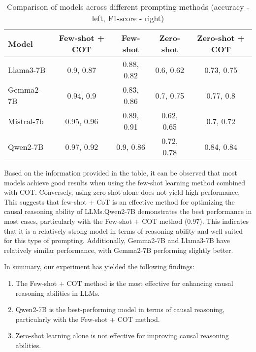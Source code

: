 \begin{table}[ht]
  \centering
  \begin{tabular}{|l|c|c|c|c|}
      \hline
      \textbf{Model}    & \textbf{Few-shot + COT} & \textbf{Few-shot} & \textbf{Zero-shot} & \textbf{Zero-shot + COT} \\ \hline

      Llama3-7B & 0.9, 0.87  & 0.88, 0.82  & 0.6, 0.62  & 0.73, 0.75  \\ \hline 

      Gemma2-7B & 0.94, 0.9 & 0.83, 0.86 & 0.7, 0.75 & 0.77, 0.8 \\ \hline 

      Mistral-7b & 0.95, 0.96 & 0.89, 0.91 & 0.62, 0.65 & 0.7, 0.72 \\ \hline

      Qwen2-7B & 0.97, 0.92 & 0.9, 0.86 & 0.72, 0.78 & 0.84, 0.84 \\ \hline

  \end{tabular}
  \caption{Comparison of models across different prompting methods (accuracy - left, F1-score - right)}
  \label{tab:model_comparison}
\end{table}


Based on the information provided in the table, it can be observed that most models achieve good results when using the few-shot learning method combined with COT. Conversely, using zero-shot alone does not yield high performance. 
This suggests that few-shot + CoT is an effective method for optimizing the causal reasoning ability of LLMs.Qwen2-7B demonstrates the best performance in most cases, particularly with the Few-shot + COT method (0.97). 
This indicates that it is a relatively strong model in terms of reasoning ability and well-suited for this type of prompting. Additionally, Gemma2-7B and Llama3-7B have relatively similar performance, with Gemma2-7B performing slightly better.

In summary, our experiment has yielded the following findings:

\begin{enumerate}
  \item The Few-shot + COT method is the most effective for enhancing causal reasoning abilities in LLMs.
  \item Qwen2-7B is the best-performing model in terms of causal reasoning, particularly with the Few-shot + COT method.
  \item Zero-shot learning alone is not effective for improving causal reasoning abilities.
\end{enumerate}
